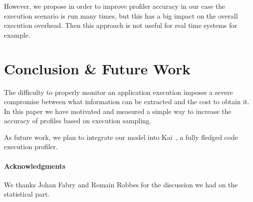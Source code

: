 \documentclass{sig-alternate}
\newcommand{\seclabel}[1]{\label{sec:#1}}
\begin{document}
However, we propose in order to improve profiler accuracy in our case the execution scenario is run many times, but this has a big impact on the overall execution overhead. Then this approach is not useful for real time systems for example.

\section{Conclusion \& Future Work}\seclabel{conclusion}

The difficulty to properly monitor an application execution imposes a severe compromise between what information can be extracted and the cost to obtain it. In this paper we have motivated and measured a simple way to increase the accuracy of profiles based on execution sampling.

As future work, we plan to integrate our model into Kai~\cite{Berg11f}, a fully fledged code execution profiler.


\paragraph{Acknowledgments} We thanks Johan Fabry and Romain Robbes for the discussion we had on the statistical part.





%
\end{document}
